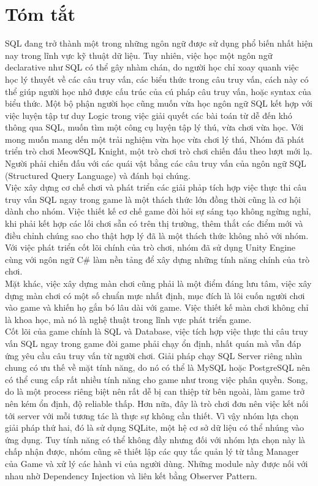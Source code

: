 \section*{Tóm tắt}
\thispagestyle{empty}

\hspace*{0.5cm} SQL đang trở thành một trong những ngôn ngữ được sử dụng phổ biến nhất hiện nay trong lĩnh vực kỹ thuật dữ liệu. Tuy nhiên, việc học một ngôn ngữ declarative như SQL có thể gây nhàm chán, do người học chỉ xoay quanh việc học lý thuyết về các câu truy vấn, các biểu thức trong câu truy vấn, cách này có thể giúp người học nhớ được cấu trúc của cú pháp câu truy vấn, hoặc syntax của biểu thức. Một bộ phận người học cũng muốn vừa học ngôn ngữ SQL kết hợp với việc luyện tập tư duy Logic trong việc giải quyết các bài toán từ dễ đến khó thông qua SQL, muốn tìm một công cụ luyện tập lý thú, vừa chơi vừa học. Với mong muốn mang dến một trải nghiệm vừa học vừa chơi lý thú, Nhóm đã phát triển trò chơi MeowSQL Knight, một trò chơi trò chơi chiến đấu theo lượt mới lạ. Người phải chiến đấu với các quái vật bằng các câu truy vấn của ngôn ngữ SQL (Structured Query Language) và đánh bại chúng. \\
\hspace*{0.5cm} Việc xây dựng cơ chế chơi và phát triển các giải phảp tích hợp việc thực thi câu truy vấn SQL ngay trong game là một thách thức lớn đồng thời cũng là cơ hội dành cho nhóm. Việc thiết kế cơ chế game đòi hỏi sự sáng tạo không ngừng nghỉ, khi phải kết hợp các lối chơi sẵn có trên thị trường, thêm thắt các điểm mới và điều chỉnh chúng sao cho thật hợp lý đã là một thách thức không nhỏ với nhóm. Với việc phát triển cốt lõi chính của trò chơi, nhóm đã sử dụng Unity Engine cùng với ngôn ngữ C\# làm nền tảng để xây dựng những tính năng chính của trò chơi.\\
\hspace*{0.5cm} Mặt khác, việc xây dựng màn chơi cũng phải là một điểm đáng lưu tâm, việc xây dựng màn chơi có một số chuẩn mực nhất định, mục đích là lôi cuốn người chơi vào game và khiến họ gắn bó lâu dài với game. Việc thiết kế màn chơi không chỉ là khoa học, mà nó là nghệ thuật trong lĩnh vực phát triển game.\\
\hspace*{1cm} Cốt lõi của game chính là SQL và Database, việc tích hợp việc thực thi câu truy vấn SQL ngay trong game đòi game phải chạy ổn định, nhất quán mà vẫn đáp ứng yêu cầu câu truy vấn từ người chơi. Giải pháp chạy SQL Server riêng nhìn chung có ưu thế về mặt tính năng, do nó có thể là MySQL hoặc PostgreSQL nên có thể cung cấp rất nhiều tính năng cho game như trong việc phân quyền. Song, do là một process riêng biệt nên rất dễ bị can thiệp từ bên ngoài, làm game trở nên kém ổn định, độ reliable thấp. Hơn nữa, đây là trò chơi đơn nên việc kết nối tới server với mỗi tương tác là thực sự không cần thiết. Vì vậy nhóm lựa chọn giải pháp thứ hai, đó là sử dụng SQLite, một hệ cơ sở dữ liệu có thể nhúng vào ứng dụng. Tuy tính năng có thể không đầy nhưng đối với nhóm lựa chọn này là chấp nhận được, nhóm cũng sẽ thiết lập các quy tắc quản lý từ tầng Manager của Game và xử lý các hành vi của người dùng. Những module này được nối với nhau nhờ Dependency Injection và liên kết bằng Observer Pattern.\\
